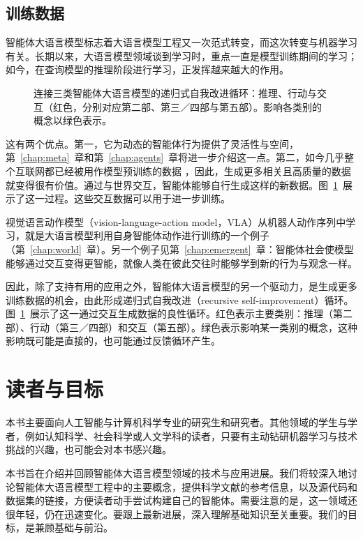 \subsection{训练数据}
智能体大语言模型标志着大语言模型工程又一次范式转变，而这次转变与机器学习有关。长期以来，大语言模型领域谈到学习时，重点一直是模型训练期间的学习；如今，在查询模型的推理阶段进行学习，正发挥越来越大的作用。

\begin{figure}
    \centering
    
    \caption{连接三类智能体大语言模型的递归式自我改进循环：推理、行动与交互（红色，分别对应第二部、第三／四部与第五部）。影响各类别的概念以绿色表示。}
    \label{fig:virtuous}
\end{figure}

这有两个优点。第一，它为动态的智能体行为提供了灵活性与空间，第~\ref{chap:meta}~章和第~\ref{chap:agents}~章将进一步介绍这一点。第二，如今几乎整个互联网都已经被用作模型预训练的数据 \citep{sutskever2024}，因此，生成更多相关且高质量的数据就变得很有价值。通过与世界交互，智能体能够自行生成这样的新数据。图~\ref{fig:virtuous}~展示了这一过程。这些交互数据可以用于进一步训练。

视觉语言动作模型（vision-language-action model，VLA）从机器人动作序列中学习，就是大语言模型利用自身智能体动作进行训练的一个例子（第~\ref{chap:world}~章）。另一个例子见第~\ref{chap:emergent}~章：智能体社会使模型能够通过交互变得更智能，就像人类在彼此交往时能够学到新的行为与观念一样。

因此，除了支持有用的应用之外，智能体大语言模型的另一个驱动力，是生成更多训练数据的机会，由此形成递归式自我改进（recursive self-improvement）循环。图~\ref{fig:virtuous}~展示了这一通过交互生成数据的良性循环。红色表示主要类别：推理（第二部）、行动（第三／四部）和交互（第五部）。绿色表示影响某一类别的概念，这种影响既可能是直接的，也可能通过反馈循环产生。

\section{读者与目标}
本书主要面向人工智能与计算机科学专业的研究生和研究者。其他领域的学生与学者，例如认知科学、社会科学或人文学科的读者，只要有主动钻研机器学习与技术挑战的兴趣，也可能会对本书感兴趣。

本书旨在介绍并回顾智能体大语言模型领域的技术与应用进展。我们将较深入地讨论智能体大语言模型工程中的主要概念，提供科学文献的参考信息，以及源代码和数据集的链接，方便读者动手尝试构建自己的智能体。需要注意的是，这一领域还很年轻，仍在迅速变化。要跟上最新进展，深入理解基础知识至关重要。我们的目标，是兼顾基础与前沿。


